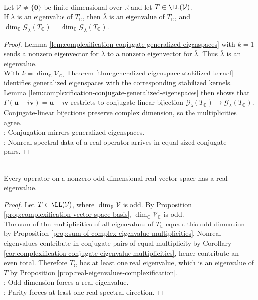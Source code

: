 \begin{corollary} \label{cor:complexification-conjugate-eigenvalue-multiplicities} \\
Let $\mathcal{V}\neq\{\mathbf{0}\}$ be finite-dimensional over $\mathbb{R}$ and let $T\in\LL(\mathcal{V})$.\\
If $\lambda$ is an eigenvalue of $T_{\mathbb{C}}$, then $\overline{\lambda}$ is an eigenvalue of $T_{\mathbb{C}}$, and $\dim_{\mathbb{C}}\mathcal{G}_{\lambda}(T_{\mathbb{C}}) =\dim_{\mathbb{C}}\mathcal{G}_{\overline{\lambda}}(T_{\mathbb{C}})$.
\begin{proof}
Lemma \ref{lem:complexification-conjugate-generalized-eigenspaces} with $k=1$ sends a nonzero eigenvector for $\lambda$ to a nonzero eigenvector for $\overline{\lambda}$. Thus $\overline{\lambda}$ is an eigenvalue.\\
With $k=\dim_{\mathbb{C}}\mathcal{V}_{\mathbb{C}}$, Theorem \ref{thm:generalized-eigenspace-stabilized-kernel} identifies generalized eigenspaces with the corresponding stabilized kernels. Lemma \ref{lem:complexification-conjugate-generalized-eigenspaces} then shows that $\Gamma(\mathbf{u}+i\mathbf{v})=\mathbf{u}-i\mathbf{v}$ restricts to conjugate-linear bijection $\mathcal{G}_{\lambda}(T_{\mathbb{C}}) \longrightarrow \mathcal{G}_{\overline{\lambda}}(T_{\mathbb{C}})$.\\
Conjugate-linear bijections preserve complex dimension, so the multiplicities agree.\\
: Conjugation mirrors generalized eigenspaces.\\
: Nonreal spectral data of a real operator arrives in equal-sized conjugate pairs.
\end{proof}
\end{corollary}

\begin{corollary} \label{cor:odd-dimensional-real-operator-has-eigenvalue} \\
Every operator on a nonzero odd-dimensional real vector space has a real eigenvalue.
\begin{proof}
Let $T\in\LL(\mathcal{V})$, where $\dim_{\mathbb{R}}\mathcal{V}$ is odd. By Proposition \ref{prop:complexification-vector-space-basis}, $\dim_{\mathbb{C}}\mathcal{V}_{\mathbb{C}}$ is odd.\\
The sum of the multiplicities of all eigenvalues of $T_{\mathbb{C}}$ equals this odd dimension by Proposition \ref{prop:sum-of-complex-eigenvalue-multiplicities}. Nonreal eigenvalues contribute in conjugate pairs of equal multiplicity by Corollary \ref{cor:complexification-conjugate-eigenvalue-multiplicities}, hence contribute an even total. Therefore $T_{\mathbb{C}}$ has at least one real eigenvalue, which is an eigenvalue of $T$ by Proposition \ref{prop:real-eigenvalues-complexification}.\\
: Odd dimension forces a real eigenvalue.\\
: Parity forces at least one real spectral direction.
\end{proof}
\end{corollary}

